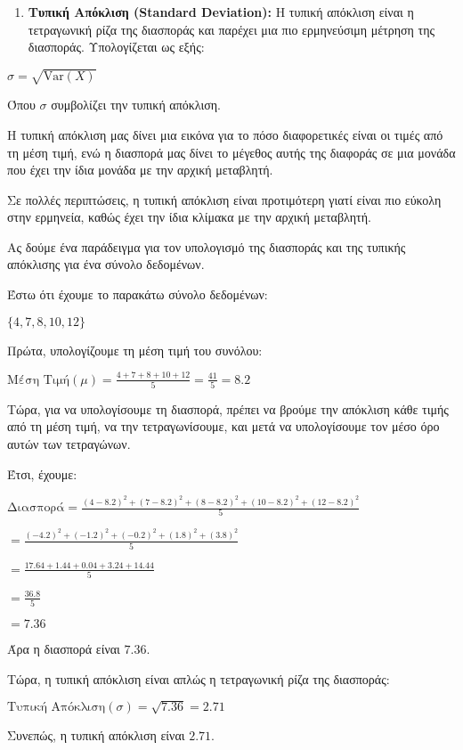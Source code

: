 \documentclass[11pt]{article}
\providecommand{\tightlist}{%
      \setlength{\itemsep}{0pt}\setlength{\parskip}{0pt}}
\begin{document}
\begin{enumerate}
\def\labelenumi{\arabic{enumi}.}
\setcounter{enumi}{1}
\tightlist
\item
  \textbf{Τυπική Απόκλιση (Standard Deviation):} Η τυπική απόκλιση είναι
  η τετραγωνική ρίζα της διασποράς και παρέχει μια πιο ερμηνεύσιμη
  μέτρηση της διασποράς. Υπολογίζεται ως εξής:
\end{enumerate}

$ \sigma = \sqrt{\text{Var}(X)} $

Όπου $ \sigma $ συμβολίζει την τυπική απόκλιση.

Η τυπική απόκλιση μας δίνει μια εικόνα για το πόσο διαφορετικές είναι οι
τιμές από τη μέση τιμή, ενώ η διασπορά μας δίνει το μέγεθος αυτής της
διαφοράς σε μια μονάδα που έχει την ίδια μονάδα με την αρχική μεταβλητή.

Σε πολλές περιπτώσεις, η τυπική απόκλιση είναι προτιμότερη γιατί είναι
πιο εύκολη στην ερμηνεία, καθώς έχει την ίδια κλίμακα με την αρχική
μεταβλητή.

Ας δούμε ένα παράδειγμα για τον υπολογισμό της διασποράς και της τυπικής
απόκλισης για ένα σύνολο δεδομένων.

Έστω ότι έχουμε το παρακάτω σύνολο δεδομένων:

$ \{4, 7, 8, 10, 12\} $

Πρώτα, υπολογίζουμε τη μέση τιμή του συνόλου:

$ \text{Μέση Τιμή} (\mu) = \frac{4 + 7 + 8 + 10 + 12}{5} = \frac{41}{5}
= 8.2 $

Τώρα, για να υπολογίσουμε τη διασπορά, πρέπει να βρούμε την απόκλιση
κάθε τιμής από τη μέση τιμή, να την τετραγωνίσουμε, και μετά να
υπολογίσουμε τον μέσο όρο αυτών των τετραγώνων.

Έτσι, έχουμε:

$ \text{Διασπορά} =
\frac{(4-8.2)^2 + (7-8.2)^2 + (8-8.2)^2 + (10-8.2)^2 + (12-8.2)^2}{5} $

$ = \frac{(-4.2)^2 + (-1.2)^2 + (-0.2)^2 + (1.8)^2 + (3.8)^2}{5} $

$ = \frac{17.64 + 1.44 + 0.04 + 3.24 + 14.44}{5} $

$ = \frac{36.8}{5} $

$ = 7.36 $

Άρα η διασπορά είναι \(7.36\).

Τώρα, η τυπική απόκλιση είναι απλώς η τετραγωνική ρίζα της διασποράς:

$ \text{Τυπική Απόκλιση} (\sigma) = \sqrt{7.36} = 2.71 $

Συνεπώς, η τυπική απόκλιση είναι \(2.71\).
\end{document}
